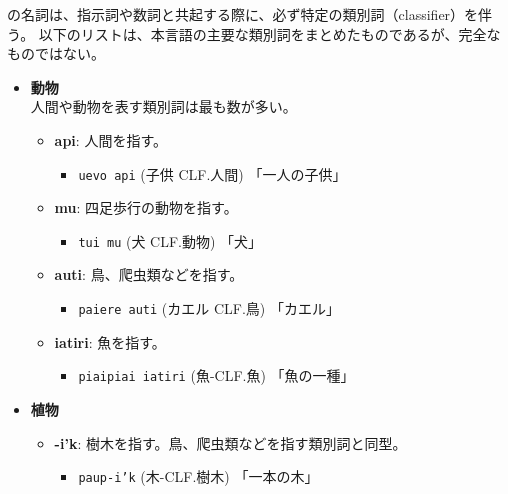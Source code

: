 \langname の名詞は、指示詞や数詞と共起する際に、必ず特定の類別詞（classifier）を伴う。
以下のリストは、本言語の主要な類別詞をまとめたものであるが、完全なものではない。

\begin{itemize}
    \item \textbf{動物}\\
    人間や動物を表す類別詞は最も数が多い。
        \begin{itemize}
            \item \textbf{api}: 人間を指す。
                \begin{itemize}
                    \item \texttt{uevo api} (子供 CLF.人間)
                    \quad 「一人の子供」
                \end{itemize}
            \item \textbf{mu}: 四足歩行の動物を指す。
                \begin{itemize}
                    \item \texttt{tui mu} (犬 CLF.動物)
                    \quad 「犬」
                \end{itemize}
            \item \textbf{auti}: 鳥、爬虫類などを指す。
                \begin{itemize}
                    \item \texttt{paiere auti} (カエル CLF.鳥) 
                    \quad 「カエル」
                \end{itemize}
            \item \textbf{iatiri}: 魚を指す。
                \begin{itemize}
                    \item \texttt{piaipiai iatiri} (魚-CLF.魚)
                    \quad 「魚の一種」
                \end{itemize}
        \end{itemize}
    \item \textbf{植物} %
        \begin{itemize}
            \item \textbf{-i'k}: 樹木を指す。鳥、爬虫類などを指す類別詞と同型。
                \begin{itemize}
                    \item \texttt{paup-i'k} (木-CLF.樹木) %
                    \quad 「一本の木」

\end{itemize}
\end{itemize}
\end{itemize}
